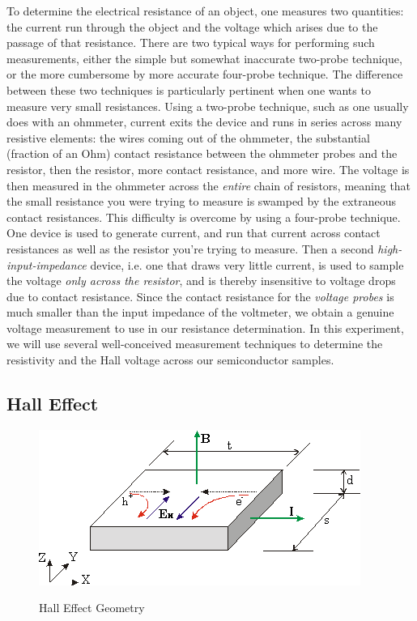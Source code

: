 \documentclass{../lab}
\begin{document}
To determine the electrical resistance of an object, one measures two quantities: the current run through the object and the voltage which arises due to the passage of that resistance. There are two typical ways for performing such measurements, either the simple but somewhat inaccurate two-probe technique, or the more cumbersome by more accurate four-probe technique. The difference between these two techniques is particularly pertinent when one wants to measure very small resistances. Using a two-probe technique, such as one usually does with an ohmmeter, current exits the device and runs in series across many resistive elements: the wires coming out of the ohmmeter, the substantial (fraction of an Ohm) contact resistance between the ohmmeter probes and the resistor, then the resistor, more contact resistance, and more wire. The voltage is then measured in the ohmmeter across the \emph{entire} chain of resistors, meaning that the small resistance you were trying to measure is swamped by the extraneous contact resistances. This difficulty is overcome by using a four-probe technique. One device is used to generate current, and run that current across contact resistances as well as the resistor you're trying to measure. Then a second \emph{high-input-impedance} device, i.e. one that draws very little current, is used to sample the voltage \emph{only across the resistor}, and is thereby insensitive to voltage drops due to contact resistance. Since the contact resistance for the \emph{voltage probes} is much smaller than the input impedance of the voltmeter, we obtain a genuine voltage measurement to use in our resistance determination. In this experiment, we will use several well-conceived measurement techniques to determine the resistivity and the Hall voltage across our semiconductor samples.

\subsection{Hall Effect}

\begin{figure}[h]
    \centering
    \href{http://experimentationlab.berkeley.edu/sites/default/files/images/SHEimage028.gif}{\includegraphics[width=0.5\linewidth]{images/SHEimage028.png}}
    \caption{Hall Effect Geometry}
    \label{fig:HallEffectGeometry}
\end{figure}
\end{document}
